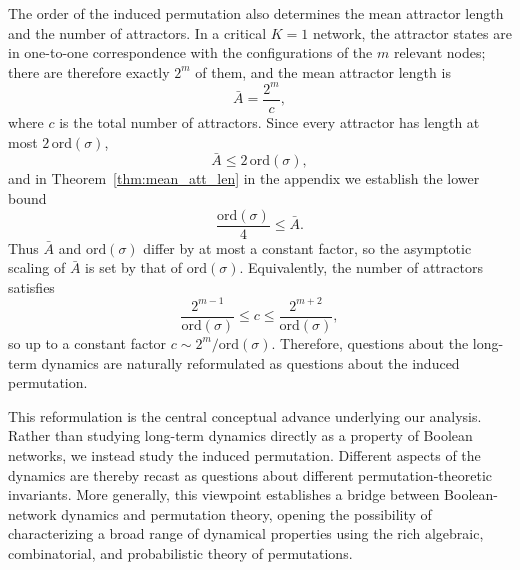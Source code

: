 \documentclass[11pt, reqno]{elsarticle}%
\theoremstyle{plain}
\begin{document}
The order of the induced permutation also determines the mean attractor length
and the number of attractors. In a critical $K=1$ network, the attractor states
are in one-to-one correspondence with the configurations of the $m$ relevant
nodes; there are therefore exactly $2^m$ of them, and the mean attractor length
is
\begin{equation}\label{eq:expected_length}
  \bar{A}=\frac{2^m}{c},
\end{equation}
where $c$ is the total number of attractors. Since every attractor has length
at most $2\,\mathrm{ord}(\sigma)$,
\begin{equation}
  \bar A\le 2\,\mathrm{ord}(\sigma),
\end{equation}
and in Theorem~\ref{thm:mean_att_len} in the appendix we establish the lower bound
\begin{equation}
  \frac{\mathrm{ord}(\sigma)}{4}\le\bar A.
\end{equation}
Thus $\bar A$ and $\mathrm{ord}(\sigma)$ differ by at most a constant factor, so
the asymptotic scaling of $\bar A$ is set by that of $\mathrm{ord}(\sigma)$.
Equivalently, the number of attractors satisfies
\begin{equation}
  \frac{2^{m-1}}{\mathrm{ord}(\sigma)}\le c\le\frac{2^{m+2}}{\mathrm{ord}(\sigma)},
\end{equation}
so up to a constant factor $c\sim 2^m/\mathrm{ord}(\sigma)$. Therefore,
questions about the long-term dynamics are naturally reformulated as questions
about the induced permutation.

This reformulation is the central conceptual advance underlying our analysis. Rather than studying long-term dynamics directly as a property of Boolean networks, we instead study the induced permutation. Different aspects of the dynamics are thereby recast as questions about different permutation-theoretic invariants. More generally, this viewpoint establishes a bridge between Boolean-network dynamics and permutation theory, opening the possibility of characterizing a broad range of dynamical properties using the rich algebraic, combinatorial, and probabilistic theory of permutations.
\end{document}

